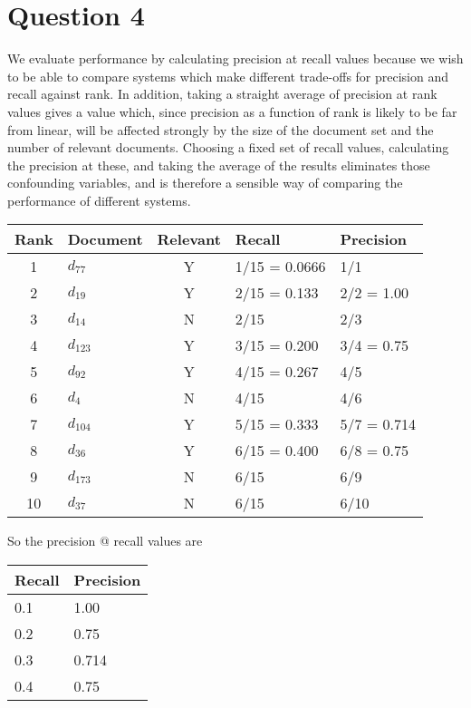\documentclass[11pt]{article}
\begin{document}


\section*{Question 4}

We evaluate performance by calculating precision at recall values because we
wish to be able to compare systems which make different trade-offs for
precision and recall against rank. In addition, taking a straight average of
precision at rank values gives a value which, since precision as a function of
rank is likely to be far from linear, will be affected strongly by the size of
the document set and the number of relevant documents. Choosing a fixed set of
recall values, calculating the precision at these, and taking the average of
the results eliminates those confounding variables, and is therefore a sensible
way of comparing the performance of different systems.


\begin{tabular}{c l c l l}
Rank & Document & Relevant & Recall & Precision \\
\hline
1 & $d_{77}$  & Y & 1/15 = 0.0666 & 1/1 \\
2 & $d_{19}$  & Y & 2/15 = 0.133  & 2/2 = 1.00 \\
3 & $d_{14}$  & N & 2/15          & 2/3 \\
4 & $d_{123}$ & Y & 3/15 = 0.200  & 3/4 = 0.75 \\
5 & $d_{92}$  & Y & 4/15 = 0.267  & 4/5 \\
6 & $d_{4}$   & N & 4/15          & 4/6 \\
7 & $d_{104}$ & Y & 5/15 = 0.333  & 5/7 = 0.714 \\
8 & $d_{36}$  & Y & 6/15 = 0.400  & 6/8 = 0.75 \\
9 & $d_{173}$ & N & 6/15          & 6/9 \\
10 & $d_{37}$ & N & 6/15          & 6/10 \\
\end{tabular}

So the precision @ recall values are

\begin{tabular}{l l}
Recall & Precision \\
\hline
0.1 & 1.00 \\
0.2 & 0.75 \\
0.3 & 0.714 \\
0.4 & 0.75 \\
\end{tabular}
\end{document}
